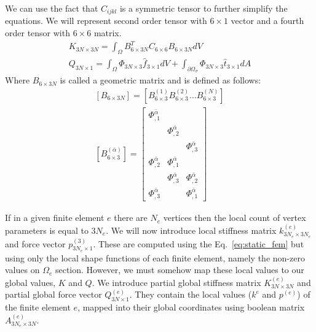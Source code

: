\documentclass[en]{minipw} %
\begin{document}
We can use the fact that $C_{ijkl}$ is a symmetric tensor to further simplify the equations. We will represent second order tensor with $6 \times 1$ vector and a fourth order tensor with $6 \times 6$ matrix.
\begin{equation}
\label{eq:static_fem}
\begin{aligned}
K_{3N \times 3N} = \int_{\Omega} B^{T}_{6 \times 3N} C_{6 \times 6} B_{6 \times 3N} dV 
\\
Q_{3N \times 1} = \int_{\Omega} \Phi_{3N \times 3} \hat{f}_{3 \times 1} dV + \int_{\partial \Omega_{\sigma}} \Phi_{3N \times 3} \hat{t}_{3 \times 1} dA
\end{aligned}
\end{equation}
Where $B_{6 \times 3N}$ is called a geometric matrix and is defined as follows:
\begin{equation}
\label{eq:geometric_matrix}
\begin{aligned}
[B_{6 \times 3N}] = [B^{(1)}_{6 \times 3} B^{(2)}_{6 \times 3} ... B^{(N)}_{6 \times 3}]
\\
[B^{(\bar{\alpha})}_{6 \times 3}] = 
\begin{bmatrix}
\Phi^{\bar{\alpha}}_{,1} & & \\
 & \Phi^{\bar{\alpha}}_{,2} & \\
& & \Phi^{\bar{\alpha}}_{,3} \\
\Phi^{\bar{\alpha}}_{,2} & \Phi^{\bar{\alpha}}_{,1} & \\
& \Phi^{\bar{\alpha}}_{,3} & \Phi^{\bar{\alpha}}_{,2} \\
\Phi^{\bar{\alpha}}_{,3} & & \Phi^{\bar{\alpha}}_{,1}
\end{bmatrix}
\end{aligned}
\end{equation}

If in a given finite element $e$ there are $N_e$ vertices then the local count of vertex parameters is equal to $3N_e$. We will now introduce local stiffness matrix $k^{(e)}_{3N_e \times 3N_e}$ and force vector $p^{(3)}_{3N_e \times 1}$. These are computed using the Eq.~\ref{eq:static_fem} but using only the local shape functions of each finite element, namely the non-zero values on $\Omega_{e}$ section.
However, we must somehow map these local values to our global values, $K$ and $Q$. We introduce partial global stiffness matrix $K^{(e)}_{3N \times 3N}$ and partial global force vector $Q^{(e)}_{3N \times 1}$. They contain the local values ($k^{e}$ and $p^{(e)}$) of the finite element $e$, mapped into their global coordinates using boolean matrix $A^{(e)}_{3N_{e} \times 3N}$.
\end{document}
